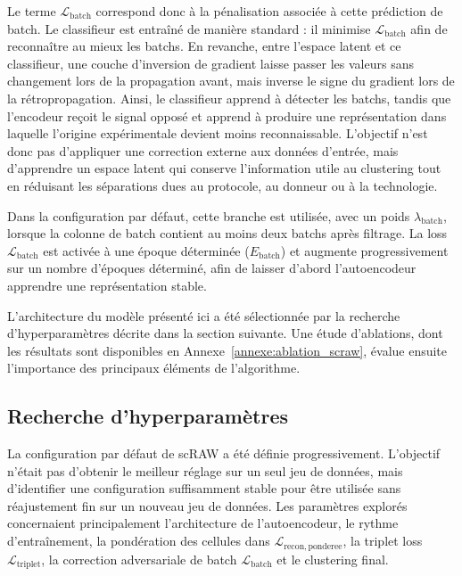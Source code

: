 Le terme \(\mathcal{L}_{\mathrm{batch}}\) correspond donc à la pénalisation associée à cette prédiction de batch. Le classifieur est entraîné de manière standard : il minimise \(\mathcal{L}_{\mathrm{batch}}\) afin de reconnaître au mieux les batchs. En revanche, entre l'espace latent et ce classifieur, une couche d'inversion de gradient laisse passer les valeurs sans changement lors de la propagation avant, mais inverse le signe du gradient lors de la rétropropagation. Ainsi, le classifieur apprend à détecter les batchs, tandis que l'encodeur reçoit le signal opposé et apprend à produire une représentation dans laquelle l'origine expérimentale devient moins reconnaissable. L'objectif n'est donc pas d'appliquer une correction externe aux données d'entrée, mais d'apprendre un espace latent qui conserve l'information utile au clustering tout en réduisant les séparations dues au protocole, au donneur ou à la technologie.

Dans la configuration par défaut, cette branche est utilisée, avec un poids \(\lambda_{\mathrm{batch}}\), lorsque la colonne de batch contient au moins deux batchs après filtrage. La loss \(\mathcal{L}_{\mathrm{batch}}\) est activée à une époque déterminée ($E_{\mathrm{batch}}$) et augmente progressivement sur un nombre d'époques déterminé, afin de laisser d'abord l'autoencodeur apprendre une représentation stable.

L'architecture du modèle présenté ici a été sélectionnée par la recherche d'hyperparamètres décrite dans la section suivante. Une étude d'ablations, dont les résultats sont disponibles en Annexe~\ref{annexe:ablation_scraw}, évalue ensuite l'importance des principaux éléments de l'algorithme.

\subsection{Recherche d'hyperparamètres}
\label{subsec:recherche_hyperparametres}

La configuration par défaut de scRAW a été définie progressivement. L'objectif n'était pas d'obtenir le meilleur réglage sur un seul jeu de données, mais d'identifier une configuration suffisamment stable pour être utilisée sans réajustement fin sur un nouveau jeu de données. Les paramètres explorés concernaient principalement l'architecture de l'autoencodeur, le rythme d'entraînement, la pondération des cellules dans \(\mathcal{L}_{\mathrm{recon,ponderee}}\), la triplet loss \(\mathcal{L}_{\mathrm{triplet}}\), la correction adversariale de batch \(\mathcal{L}_{\mathrm{batch}}\) et le clustering final.

